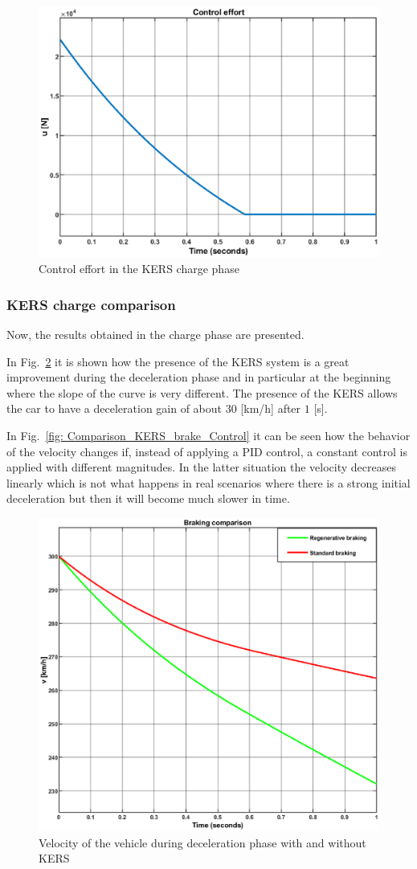 \documentclass[11pt]{article}
\begin{document}
\begin{figure}[H]
\centering
\includegraphics[width=.6\textwidth]{Images/Results_Dynamics/Charge/Control.eps}
\caption{Control effort in the KERS charge phase}
\label{fig: Contro_Effort_Charge}
\end{figure}

\subsubsection{KERS charge comparison}

Now, the results obtained in the charge phase are presented.

In Fig.~\ref{fig: Comparison_KERS_brake} it is shown how the presence of the KERS system is a great improvement during the deceleration phase and in particular at the beginning where the slope of the curve is very different. The presence of the KERS allows the car to have a deceleration gain of about $30$ [km/h] after $1$ [s].

In Fig.~\ref{fig: Comparison_KERS_brake_Control} it can be seen how the behavior of the velocity changes if, instead of applying a PID control, a constant control is applied with different magnitudes. In the latter situation the velocity decreases linearly which is not what happens in real scenarios where there is a strong initial deceleration but then it will become much slower in time.

\begin{figure}[H]
\centering
\includegraphics[width=.6\textwidth]{Images/Results_Dynamics/Charge_comparison/brake_kers_vs_nokers.eps}
\caption{Velocity of the vehicle during deceleration phase with and without KERS}
\label{fig: Comparison_KERS_brake}
\end{figure}
\end{document}
